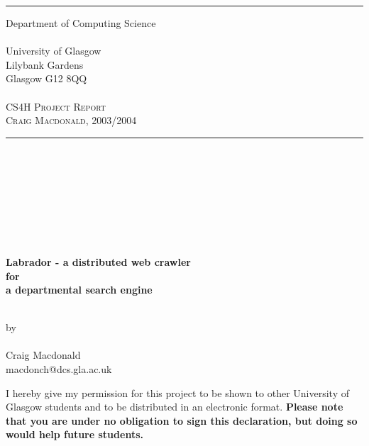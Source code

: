 \documentclass[11pt]{report}
\begin{document}
\begin{titlepage}
{\sffamily
	\begin{minipage}{0.3 \columnwidth}
	\end{minipage}
	\begin{minipage}{0.55 \columnwidth}
	\noindent \rule{\linewidth}{0.25mm}
	\begin{center}
	{\Large{Department of Computing Science \\ \ \\ University of Glasgow \\
Lilybank Gardens\\
Glasgow G12 8QQ\\ \ \\
	{\scshape CS4H Project Report \\ Craig Macdonald, 2003/2004}}
	
}
\end{center}
\noindent 
\rule{\linewidth}{0.25mm}
\end{minipage}

\begin{center}
\ \\
\ \\
\ \\
\ \\
\ \\
\ \\
\ \\
{\LARGE  {\bf\sffamily Labrador - a distributed web crawler \\for \\a departmental search engine}

\ \\

by\\

\ \\

{\sffamily Craig Macdonald}\\
{\sffamily macdonch@dcs.gla.ac.uk}

}

\end{center}
}
\end{titlepage}
\pagestyle{myheadings}
\renewcommand{\thepage}{\roman{page}}

\newpage

\noindent I hereby give my permission for this project to be shown to other
University of Glasgow students and to be distributed in an electronic
format. {\bf Please note that you are under no obligation to sign this
declaration, but doing so would help future students. }
\end{document}
